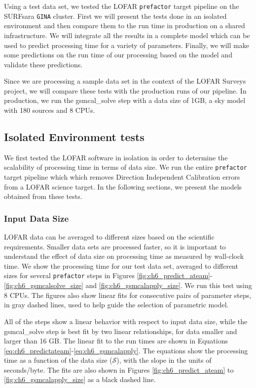 
Using a test data set, we tested the LOFAR \texttt{prefactor} target pipeline on the SURFsara \texttt{GINA} cluster. First we will present the tests done in an isolated environment and then compare them to the run time in production on a shared infrastructure. We will integrate all the results in a complete model which can be used to predict processing time for a variety of parameters. Finally, we will make some predictions on the run time of our processing based on the model and validate these predictions. 

Since we are  processing a sample data set in the context of the LOFAR Surveys project, we will compare these tests with the production runs of our pipeline. In production, we run  the {\selectfont gsmcal\_solve} step with a data size of 1GB, a sky model with 180 sources and 8 CPUs. 
 

\subsection{Isolated Environment tests}
We first tested the LOFAR software in isolation in order to determine the scalability of processing time in terms of data size. We run the entire \texttt{prefactor} target pipeline which which removes Direction Independent Calibration errors from a LOFAR science target. In the following sections, we present the models obtained from these tests.  

\subsubsection{Input Data Size}\label{sec:ch6_results_size}
LOFAR data can be averaged to different sizes based on the scientific requirements. Smaller data sets are processed faster, so it is important to understand the effect of data size on processing time as measured by wall-clock time. We show the processing time for our test data set, averaged to different sizes for several \texttt{prefactor} steps in Figures \ref{fig:ch6_predict_ateam}- \ref{fig:ch6_gsmcalsolve_size} and \ref{fig:ch6_gsmcalapply_size}. We run this test using 8 CPUs. The figures also show linear fits for consecutive pairs of parameter steps, in gray dashed lines, used to help guide the selection of parametric model. 

All of the steps show a linear behavior with respect to input data size, while the {\selectfont gsmcal\_solve step} is best fit by two linear relationships, for data smaller and larger than 16 GB. The linear fit to the run times are shown in Equations \ref{eq:ch6_predictateam}-\ref{eq:ch6_gsmcalapply}. The equations show the processing time as a function of the data size ($\mathcal{S}$), with the slope in the units of seconds/byte. The fits are also shown in Figures \ref{fig:ch6_predict_ateam} to \ref{fig:ch6_gsmcalapply_size} as a black dashed line.

